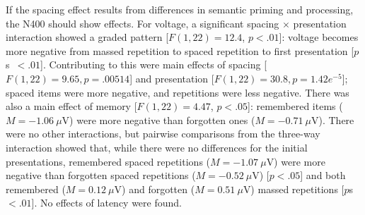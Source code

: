 If the spacing effect results from differences in semantic priming and processing, the N400 should show effects.
For voltage, a significant spacing $\times$ presentation interaction showed a graded pattern [$F(1,22)=12.4$, $p<.01$]: voltage becomes more negative from massed repetition to spaced repetition to first presentation [$p$s~$<.01$].  Contributing to this were main effects of spacing [$F(1,22)=9.65, p=.00514$] and presentation [$F(1,22)=30.8, p=1.42e^{-5}$]; spaced items were more negative, and repetitions were less negative.  There was also a main effect of memory [$F(1,22)=4.47$, $p<.05$]: remembered items ($M=-1.06~\mu$V) were more negative than forgotten ones ($M=-0.71~\mu$V).
\cbstart There were no other interactions, but pairwise comparisons from the three-way interaction showed that, while there were no differences for the initial presentations, remembered spaced repetitions ($M=-1.07~\mu$V) were more negative than forgotten spaced repetitions ($M=-0.52~\mu$V) [$p<.05$] and both remembered ($M=0.12~\mu$V) and forgotten ($M=0.51~\mu$V) massed repetitions [$p$s~$<.01$].\cbend
No effects of latency were found.

